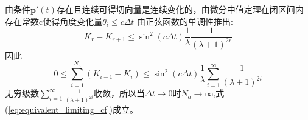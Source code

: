 \documentclass[12pt]{article}
\theoremstyle{remark}
\begin{document}
由条件$\bm{p}'(t)$存在且连续可得切向量是连续变化的，由微分中值定理在闭区间内存在常数c使得角度变化量$\theta_i\leq c\Delta t$
由正弦函数的单调性推出:
\[
K_r-K_{r+1}\leq \sin^2 (c\Delta t) \frac{1}{\lambda}\frac{1}{(\lambda+1)^{2r}}
\]
因此\[
0\leq \sum_{i=1}^{N_a}(K_{i-1}-K_{i})\leq \sin^2 (c\Delta t) \frac{1}{\lambda}\sum_{i=1}^{\infty}\frac{1}{(\lambda+1)^{2i}}
\]
无穷级数$\sum_{i=1}^{\infty}\frac{1}{(\lambda+1)^{2i}}$收敛，所以当$\Delta t\to 0$时$N_a\to \infty$,式(\ref{eq:equivalent_limiting_cf})成立。
\end{document}
